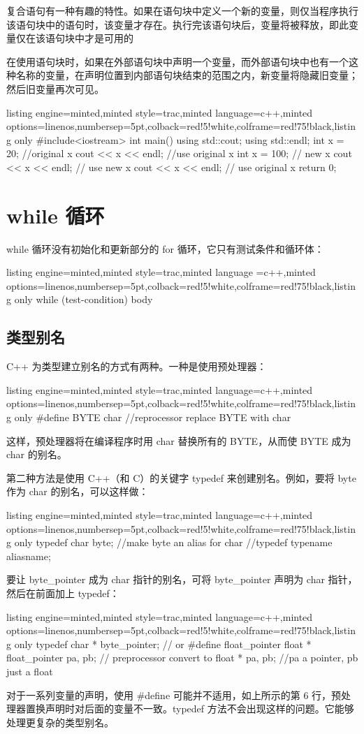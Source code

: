 复合语句有一种有趣的特性。如果在语句块中定义一个新的变量，则仅当程序执行该语句块中的语句时，该变量才存在。执行完该语句块后，变量将被释放，即此变量仅在该语句块中才是可用的

在使用语句块时，如果在外部语句块中声明一个变量，而外部语句块中也有一个这种名称的变量，在声明位置到内部语句块结束的范围之内，新变量将隐藏旧变量；然后旧变量再次可见。
\begin{tcblisting}{listing engine=minted,minted style=trac,minted language=c++,minted options={linenos,numbersep=5pt},colback=red!5!white,colframe=red!75!black,listing only}
#include<iostream>
int main()
{
	using std::cout;
	using std::endl;
	int x = 20;    //original x
	{
		cout << x << endl;  //use original x
		int x = 100;        // new x
		cout << x << endl;  // use new x
	}
	cout << x << endl;    // use original x
	return 0;
}
\end{tcblisting}
\section{while 循环}
while 循环没有初始化和更新部分的 for 循环，它只有测试条件和循环体：
\begin{tcblisting}{listing engine=minted,minted style=trac,minted language =c++,minted options={linenos,numbersep=5pt},colback=red!5!white,colframe=red!75!black,listing only}
	while (test-condition)
		body
\end{tcblisting} 
\subsection{类型别名}
C++ 为类型建立别名的方式有两种。一种是使用预处理器：
\begin{tcblisting}{listing engine=minted,minted style=trac,minted language=c++,minted options={linenos,numbersep=5pt},colback=red!5!white,colframe=red!75!black,listing only}
#define BYTE char //reprocessor replace BYTE with char
\end{tcblisting}
这样，预处理器将在编译程序时用 char 替换所有的 BYTE，从而使 BYTE 成为 char 的别名。

第二种方法是使用 C++（和 C）的关键字 typedef 来创建别名。例如，要将 byte 作为 char 的别名，可以这样做：
\begin{tcblisting}{listing engine=minted,minted style=trac,minted language=c++,minted options={linenos,numbersep=5pt},colback=red!5!white,colframe=red!75!black,listing only}
typedef char byte; //make byte an alias for char
//typedef typename aliasname;
\end{tcblisting}
要让 byte\_pointer 成为 char 指针的别名，可将 byte\_pointer 声明为 char 指针，然后在前面加上 typedef：
\begin{tcblisting}{listing engine=minted,minted style=trac,minted language=c++,minted options={linenos,numbersep=5pt},colback=red!5!white,colframe=red!75!black,listing only}
typedef char * byte_pointer; 
// or 
#define float_pointer float *
float_pointer pa, pb;
// preprocessor convert to
float * pa, pb; //pa a pointer, pb just a float
\end{tcblisting}
对于一系列变量的声明，使用 \#define 可能并不适用，如上所示的第 6 行，预处理器置换声明时对后面的变量不一致。typedef 方法不会出现这样的问题。它能够处理更复杂的类型别名。
